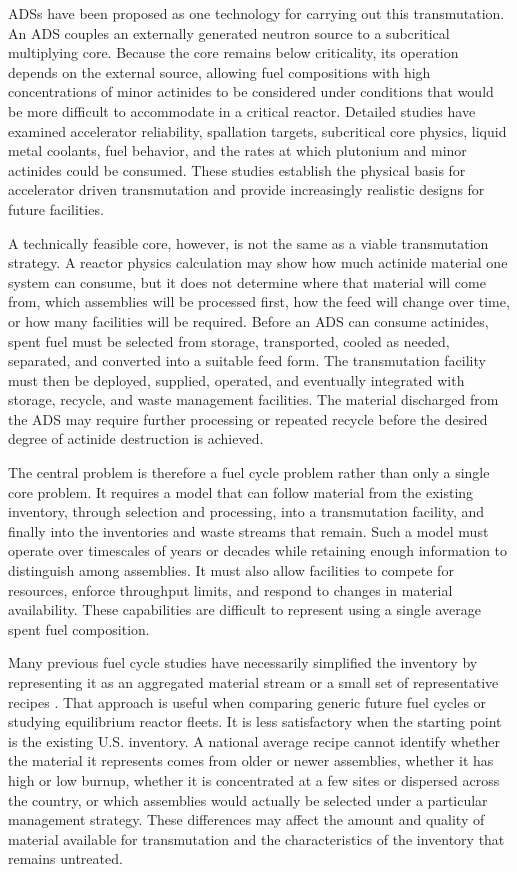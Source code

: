 \Glspl{ADS} have been proposed as one technology for carrying
out this transmutation. An \gls{ADS} couples an externally generated neutron
source to a subcritical multiplying core. Because the core remains below
criticality, its operation depends on the external source, allowing fuel
compositions with high concentrations of minor actinides to be considered
under conditions that would be more difficult to accommodate in a critical
reactor. Detailed studies have examined accelerator reliability, spallation
targets, subcritical core physics, liquid metal coolants, fuel behavior, and
the rates at which plutonium and minor actinides could be consumed. These
studies establish the physical basis for accelerator driven transmutation and
provide increasingly realistic designs for future facilities.

A technically feasible core, however, is not the same as a viable
transmutation strategy. A reactor physics calculation may show how much
actinide material one system can consume, but it does not determine where that
material will come from, which assemblies will be processed first, how the
feed will change over time, or how many facilities will be required. Before an
\gls{ADS} can consume actinides, spent fuel must be selected from storage,
transported, cooled as needed, separated, and converted into a suitable feed
form. The transmutation facility must then be deployed, supplied, operated,
and eventually integrated with storage, recycle, and waste management
facilities. The material discharged from the \gls{ADS} may require further
processing or repeated recycle before the desired degree of actinide
destruction is achieved.

The central problem is therefore a fuel cycle problem rather than only a
single core problem. It requires a model that can follow material from the
existing inventory, through selection and processing, into a transmutation
facility, and finally into the inventories and waste streams that remain.
Such a model must operate over timescales of years or decades while retaining
enough information to distinguish among assemblies. It must also allow
facilities to compete for resources, enforce throughput limits, and respond
to changes in material availability. These capabilities are difficult to
represent using a single average spent fuel composition.

Many previous fuel cycle studies have necessarily simplified the inventory by
representing it as an aggregated material stream or a small set of
representative recipes \cite{rodriguez_nuclear_2020,nea_regional_scenarios_2009,coquelet_pascal_cosi6_2015}.
That approach is useful when comparing generic
future fuel cycles or studying equilibrium reactor fleets. It is less
satisfactory when the starting point is the existing U.S. inventory. A
national average recipe cannot identify whether the material it represents
comes from older or newer assemblies, whether it has high or low burnup,
whether it is concentrated at a few sites or dispersed across the country, or
which assemblies would actually be selected under a particular management
strategy. These differences may affect the amount and quality of material
available for transmutation and the characteristics of the inventory that
remains untreated.

